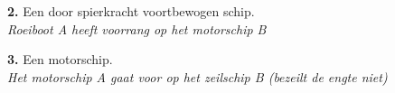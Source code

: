 \begin{figure}[H]
	\centering
	\hspace{0.02\textwidth}
	\begin{minipage}[t]{0.70\textwidth}
		\textbf{2.} Een door spierkracht voortbewogen schip.\\
		\textit{Roeiboot A heeft voorrang op het motorschip B}
	\end{minipage}
	\hfill
	\begin{minipage}[t]{0.25\textwidth}
		\label{pic:engte:4}
	\end{minipage}
	\hfill
\end{figure}

\vspace{-0.7cm}

\begin{figure}[H]
	\centering
	\hspace{0.02\textwidth}
	\begin{minipage}[t]{0.70\textwidth}
		\textbf{3.} Een motorschip.\\
		\textit{Het motorschip A gaat voor op het zeilschip B (bezeilt de engte niet)}
	\end{minipage}
	\hfill
	\begin{minipage}[t]{0.25\textwidth}
		\label{pic:engte:5}
	\end{minipage}
	\hfill
\end{figure}

\vspace{-0.7cm}

